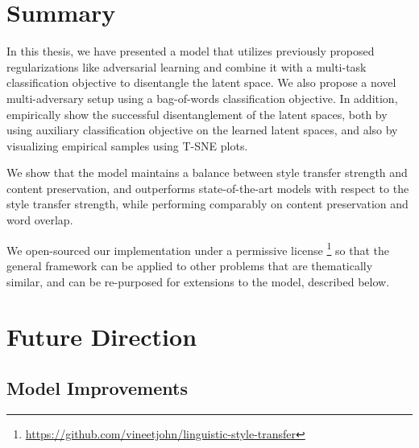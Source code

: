 \section{Summary}

In this thesis, we have presented a model that utilizes previously proposed regularizations like adversarial learning and combine it with a multi-task classification objective to disentangle the latent space. We also propose a novel multi-adversary setup using a bag-of-words classification objective. In addition,  empirically show the successful disentanglement of the latent spaces, both by using auxiliary classification objective on the learned latent spaces, and also by visualizing empirical samples using T-SNE plots.

We show that the model maintains a balance between style transfer strength and content preservation, and outperforms state-of-the-art models with respect to the style transfer strength, while performing comparably on content preservation and word overlap.


We open-sourced our implementation under a permissive license \footnote{\url{https://github.com/vineetjohn/linguistic-style-transfer}} so that the general framework can be applied to other problems that are thematically similar, and can be re-purposed for extensions to the model, described below.


\section{Future Direction}

\subsection{Model Improvements}

